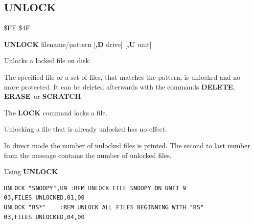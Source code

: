 \subsection{UNLOCK}
\begin{description}[leftmargin=2cm,style=nextline]
\item [Token:] \$FE \$4F
\item [Format:] {\bf UNLOCK} filename/pattern [{\bf,D} drive] [{\bf,U} unit]
\item [Usage:] Unlocks a locked file on disk.

               The specified file or
               a set of files, that matches the pattern, is unlocked
               and no more protected.
               It can be deleted afterwards with the commands {\bf DELETE},
               {\bf ERASE} or {\bf SCRATCH}

               The {\bf LOCK} command locks a file.

   \filenamedefinition

   \drivedefinition

   \unitdefinition

\item [Remarks:] Unlocking a file that is already unlocked
                 has no effect.

   In direct mode the number of unlocked files is printed.
                 The second to last number from the message
                 contains the number of unlocked files,

\item [Examples:] Using {\bf UNLOCK}
\begin{tcolorbox}[colback=black,coltext=white]
\verbatimfont{\codefont}
\begin{verbatim}
UNLOCK "SNOOPY",U9 :REM UNLOCK FILE SNOOPY ON UNIT 9
03,FILES UNLOCKED,01,00
UNLOCK "BS*"    :REM UNLOCK ALL FILES BEGINNING WITH "BS"
03,FILES UNLOCKED,04,00
\end{verbatim}
\end{tcolorbox}
\end{description}


\newpage
